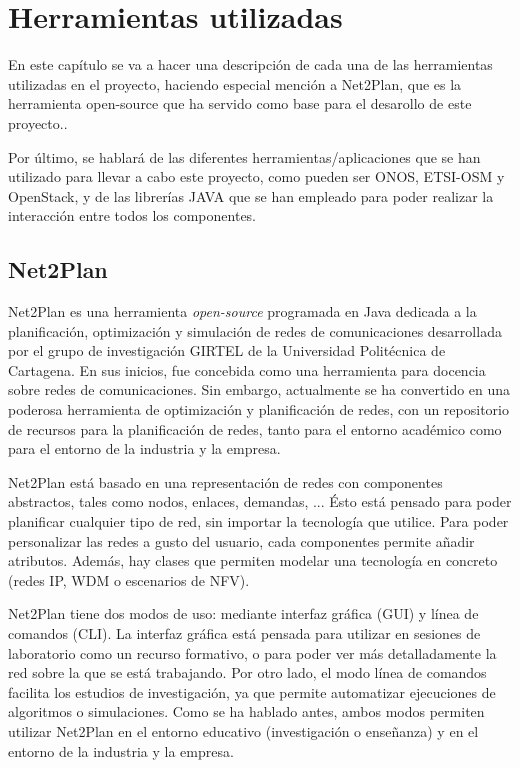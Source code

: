 \chapter{Herramientas utilizadas}

En este capítulo se va a hacer una descripción de cada una de las herramientas utilizadas en el proyecto, haciendo especial mención a Net2Plan, que es la herramienta open-source que ha servido como base para el desarollo de este proyecto..

Por último, se hablará de las diferentes herramientas/aplicaciones que se han utilizado para llevar a cabo este proyecto, como pueden ser ONOS, ETSI-OSM y OpenStack, y de las librerías JAVA que se han empleado para poder realizar la interacción entre todos los componentes.

\section{Net2Plan}
\label{sec:net2plan}

Net2Plan \cite{net2plan} es una herramienta \textit{open-source} programada en Java dedicada a la planificación, optimización y simulación de redes de comunicaciones desarrollada por el grupo de investigación GIRTEL de la Universidad Politécnica de Cartagena. En sus inicios, fue concebida como una herramienta para docencia sobre redes de comunicaciones. Sin embargo, actualmente se ha convertido en una poderosa herramienta de optimización y planificación de redes, con un repositorio de recursos para la planificación de redes, tanto para el entorno académico como para el entorno de la industria y la empresa.

Net2Plan está basado en una representación de redes con componentes abstractos, tales como nodos, enlaces, demandas, ... Ésto está pensado para poder planificar cualquier tipo de red, sin importar la tecnología que utilice. Para poder personalizar las redes a gusto del usuario, cada componentes permite añadir atributos. Además, hay clases que permiten modelar una tecnología en concreto (redes IP, WDM o escenarios de NFV).

Net2Plan tiene dos modos de uso: mediante interfaz gráfica (GUI) y línea de comandos (CLI). La interfaz gráfica está pensada para utilizar en sesiones de laboratorio como un recurso formativo, o para poder ver más detalladamente la red sobre la que se está trabajando. Por otro lado, el modo línea de comandos facilita los estudios de investigación, ya que permite automatizar ejecuciones de algoritmos o simulaciones.
Como se ha hablado antes, ambos modos permiten utilizar Net2Plan en el entorno educativo (investigación o enseñanza) y en el entorno de la industria y la empresa.

